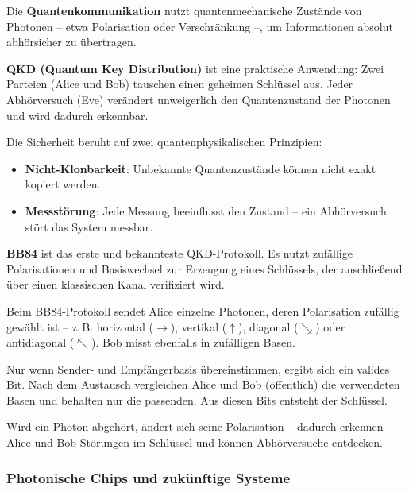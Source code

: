 Die \textbf{Quantenkommunikation} nutzt quantenmechanische Zustände von Photonen – etwa Polarisation oder Verschränkung –, um Informationen absolut abhörsicher zu übertragen.

\textbf{QKD (Quantum Key Distribution)} ist eine praktische Anwendung: Zwei Parteien (Alice und Bob) tauschen einen geheimen Schlüssel aus. Jeder Abhörversuch (Eve) verändert unweigerlich den Quantenzustand der Photonen und wird dadurch erkennbar.

\begin{tcolorbox}[didaktikbox, title=Was macht QKD sicher?] 
	\label{box:qkd}
	\small
	Die Sicherheit beruht auf zwei quantenphysikalischen Prinzipien:
	\begin{itemize}
		\item \textbf{Nicht-Klonbarkeit}: Unbekannte Quantenzustände können nicht exakt kopiert werden.
		\item \textbf{Messstörung}: Jede Messung beeinflusst den Zustand – ein Abhörversuch stört das System messbar.
	\end{itemize}
\end{tcolorbox}

\textbf{BB84} ist das erste und bekannteste QKD-Protokoll. Es nutzt zufällige Polarisationen und Basiswechsel zur Erzeugung eines Schlüssels, der anschließend über einen klassischen Kanal verifiziert wird.

\vspace{1em}
\begin{tcolorbox}[didaktikbox, title=Wie funktioniert QKD (z.\,B. BB84)?] 
	\label{box:wie funktioniert QKD}
	\small
	Beim BB84-Protokoll sendet Alice einzelne Photonen, deren Polarisation zufällig gewählt ist – z.\,B. horizontal ($\rightarrow$), vertikal ($\uparrow$), diagonal ($\searrow$) oder antidiagonal ($\nwarrow$). Bob misst ebenfalls in zufälligen Basen.
	
	Nur wenn Sender- und Empfängerbasis übereinstimmen, ergibt sich ein valides Bit. Nach dem Austausch vergleichen Alice und Bob (öffentlich) die verwendeten Basen und behalten nur die passenden. Aus diesen Bits entsteht der Schlüssel.
	
	Wird ein Photon abgehört, ändert sich seine Polarisation – dadurch erkennen Alice und Bob Störungen im Schlüssel und können Abhörversuche entdecken.
\end{tcolorbox}

\subsubsection{Photonische Chips und zukünftige Systeme}

